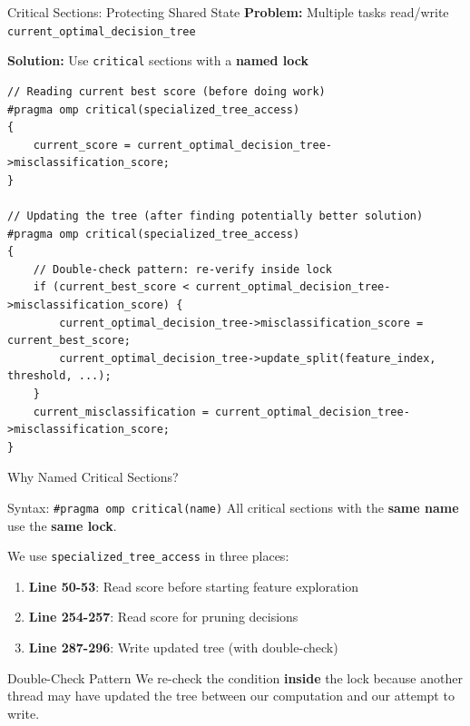 \documentclass{beamer}
\begin{document}
\begin{frame}[fragile]{Critical Sections: Protecting Shared State}
\textbf{Problem:} Multiple tasks read/write \texttt{current\_optimal\_decision\_tree}

\vspace{0.5em}
\textbf{Solution:} Use \texttt{critical} sections with a \textbf{named lock}

\begin{lstlisting}
// Reading current best score (before doing work)
#pragma omp critical(specialized_tree_access)
{
    current_score = current_optimal_decision_tree->misclassification_score;
}

// Updating the tree (after finding potentially better solution)
#pragma omp critical(specialized_tree_access)
{
    // Double-check pattern: re-verify inside lock
    if (current_best_score < current_optimal_decision_tree->misclassification_score) {
        current_optimal_decision_tree->misclassification_score = current_best_score;
        current_optimal_decision_tree->update_split(feature_index, threshold, ...);
    }
    current_misclassification = current_optimal_decision_tree->misclassification_score;
}
\end{lstlisting}
\end{frame}

\begin{frame}{Why Named Critical Sections?}
\begin{block}{Syntax: \texttt{\#pragma omp critical(name)}}
All critical sections with the \textbf{same name} use the \textbf{same lock}.
\end{block}

\vspace{0.5em}
We use \texttt{specialized\_tree\_access} in three places:
\begin{enumerate}
    \item \textbf{Line 50-53}: Read score before starting feature exploration
    \item \textbf{Line 254-257}: Read score for pruning decisions
    \item \textbf{Line 287-296}: Write updated tree (with double-check)
\end{enumerate}

\vspace{0.5em}
\begin{alertblock}{Double-Check Pattern}
We re-check the condition \textbf{inside} the lock because another thread may have updated the tree between our computation and our attempt to write.
\end{alertblock}
\end{frame}
\end{document}
